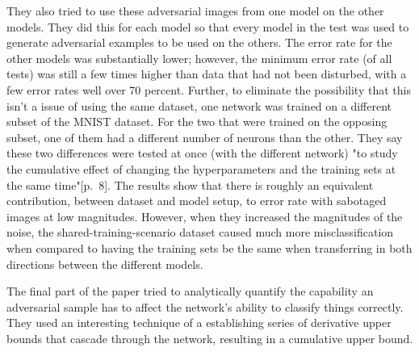 They also tried to use these adversarial images from one model on the other models. They did this
for each model so that every model in the test was used to generate adversarial examples to be used
on the others. The error rate for the other models was substantially lower; however, the minimum
error rate (of all tests) was still a few times higher than data that had not been disturbed, with a
few error rates well over 70 percent. Further, to eliminate the possibility that this isn't a issue
of using the same dataset, one network was trained on a different subset of the MNIST dataset. For
the two that were trained on the opposing subset, one of them had a different number of neurons than
the other. They say these two differences were tested at once (with the different network) "to study
the cumulative effect of changing the hyperparameters and the training sets at the same
time"\cite{szegedy2014intriguing}[p.\ 8]. The results show that there is roughly an equivalent
contribution, between dataset and model setup, to error rate with sabotaged images at low
magnitudes. However, when they increased the magnitudes of the noise, the shared-training-scenario
dataset caused much more misclassification when compared to having the training sets be the same
when transferring in both directions between the different models.

The final part of the paper tried to analytically quantify the capability an adversarial sample has
to affect the network's ability to classify things correctly. They used an interesting technique of
a establishing series of derivative upper bounds that cascade through the network, resulting in a
cumulative upper bound.